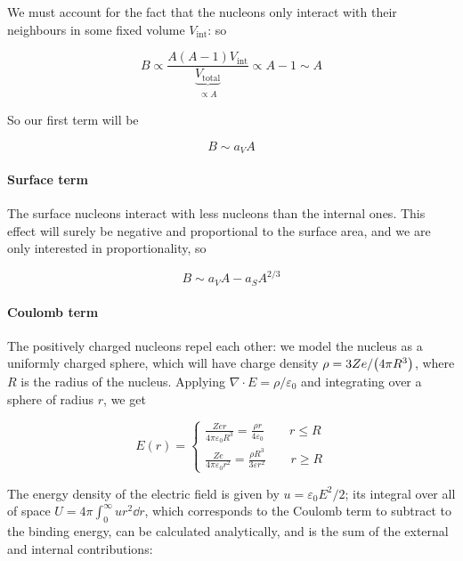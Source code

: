 \documentclass[main.tex]{subfiles}
\begin{document}
We must account for the fact that the nucleons only interact with their neighbours in some fixed volume \(V_ \text{int}\): so

\begin{equation}
    B \propto \frac{A(A-1) V _ \text{int}}{ \underbrace{V_\text{total}}_{\substack{\propto A}} } \propto A-1 \sim A
\end{equation}

So our first term will be

\begin{equation}
    B \sim a_V A
\end{equation}

\paragraph{Surface term}

The surface nucleons interact with less nucleons than the internal ones. This effect will surely be negative and proportional to the surface area, and we are only interested in proportionality, so

\begin{equation}
    B \sim a_V A - a_S A ^{2/3}
\end{equation}

\paragraph{Coulomb term}

The positively charged nucleons repel each other: we model the nucleus as a uniformly charged sphere, which will have charge density \(\rho = 3Ze / \qty(4 \pi R^3)\), where \(R\) is the radius of the nucleus. Applying \(\nabla \cdot E = \rho/ \varepsilon_0\) and integrating over a sphere of radius \(r\), we get

\begin{equation}
    E(r) = \begin{cases}
        \frac{Zer}{4 \pi \varepsilon_0 R^3 } = \frac{\rho r}{4 \varepsilon_0} \qquad r \leq R  \\
        \frac{Ze}{4 \pi \varepsilon_0 r^2} = \frac{\rho R^3}{3 \varepsilon r^2} \qquad r \geq R
\end{cases}
\end{equation}

The energy density of the electric field is given by \(u = \varepsilon_0 E^2/2\); its integral over all of  space \(U = 4 \pi \int _{0}   ^{\infty} ur^2\dd{r}   \), which corresponds to the Coulomb term to subtract to the binding energy, can be calculated analytically, and is the sum of the external and internal contributions:
\end{document}
